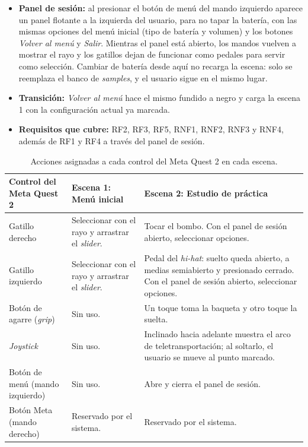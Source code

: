 \documentclass{article}
\begin{document}
\begin{itemize}
    \item \textbf{Panel de sesión:} al presionar el botón de menú del mando izquierdo aparece un panel flotante a la izquierda del usuario, para no tapar la batería, con las mismas opciones del menú inicial (tipo de batería y volumen) y los botones \textit{Volver al menú} y \textit{Salir}. Mientras el panel está abierto, los mandos vuelven a mostrar el rayo y los gatillos dejan de funcionar como pedales para servir como selección. Cambiar de batería desde aquí no recarga la escena: solo se reemplaza el banco de \textit{samples}, y el usuario sigue en el mismo lugar.
    \item \textbf{Transición:} \textit{Volver al menú} hace el mismo fundido a negro y carga la escena 1 con la configuración actual ya marcada.
    \item \textbf{Requisitos que cubre:} RF2, RF3, RF5, RNF1, RNF2, RNF3 y RNF4, además de RF1 y RF4 a través del panel de sesión.
\end{itemize}

\begin{table}[H]
\centering
\small
\renewcommand{\arraystretch}{1.35}
\begin{tabular}{@{} >{\raggedright\arraybackslash}p{} >{\raggedright\arraybackslash}p{} >{\raggedright\arraybackslash}p{} @{}}
\toprule
\textbf{Control del Meta Quest 2} & \textbf{Escena 1: Menú inicial} & \textbf{Escena 2: Estudio de práctica} \\
\midrule
Gatillo derecho & Seleccionar con el rayo y arrastrar el \textit{slider}. & Tocar el bombo. Con el panel de sesión abierto, seleccionar opciones. \\
Gatillo izquierdo & Seleccionar con el rayo y arrastrar el \textit{slider}. & Pedal del \textit{hi-hat}: suelto queda abierto, a medias semiabierto y presionado cerrado. Con el panel de sesión abierto, seleccionar opciones. \\
Botón de agarre (\textit{grip}) & Sin uso. & Un toque toma la baqueta y otro toque la suelta. \\
\textit{Joystick} & Sin uso. & Inclinado hacia adelante muestra el arco de teletransportación; al soltarlo, el usuario se mueve al punto marcado. \\
Botón de menú (mando izquierdo) & Sin uso. & Abre y cierra el panel de sesión. \\
Botón Meta (mando derecho) & Reservado por el sistema. & Reservado por el sistema. \\
\bottomrule
\end{tabular}
\caption{\label{tab:controles}Acciones asignadas a cada control del Meta Quest 2 en cada escena.}
\end{table}
\end{document}
